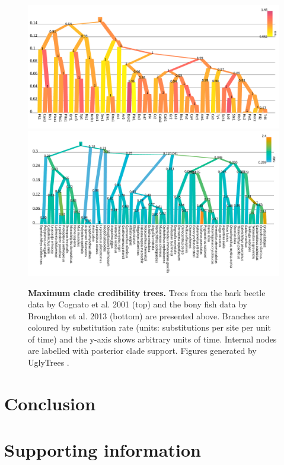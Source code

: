 \documentclass[10pt,letterpaper]{article}
\begin{document}
\begin{figure}[!h]
\includegraphics[width=\textwidth]{Figures/cognato.pdf}
\includegraphics[width=\textwidth]{Figures/broughton.pdf}
\caption{\textbf{Maximum clade credibility trees.} Trees from the bark beetle data by Cognato et al. 2001 \cite{Cognato_2001} (top) and the bony fish data by Broughton et al. 2013 \cite{Broughton_2013} (bottom) are presented above. Branches are coloured by substitution rate (units: substitutions per site per unit of time) and the y-axis shows arbitrary units of time. Internal nodes are labelled with posterior clade support. Figures generated by UglyTrees \cite{uglytrees}.  }
\label{fig:parameterisationResults}
\end{figure}






\section*{Conclusion}


\newpage
\section*{Supporting information}
\end{document}
